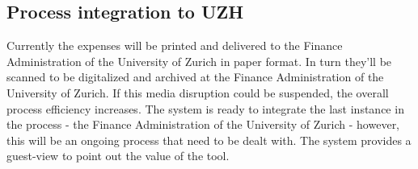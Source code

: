 \subsection{Process integration to UZH}
Currently the expenses will be printed and delivered to the Finance Administration of the University of Zurich in paper format. In turn they'll be scanned to be digitalized and archived at the Finance Administration of the University of Zurich. If this media disruption could be suspended, the overall process efficiency increases. The system is ready to integrate the last instance in the process - the Finance Administration of the University of Zurich - however, this will be an ongoing process that need to be dealt with. The system provides a guest-view to point out the value of the tool.
